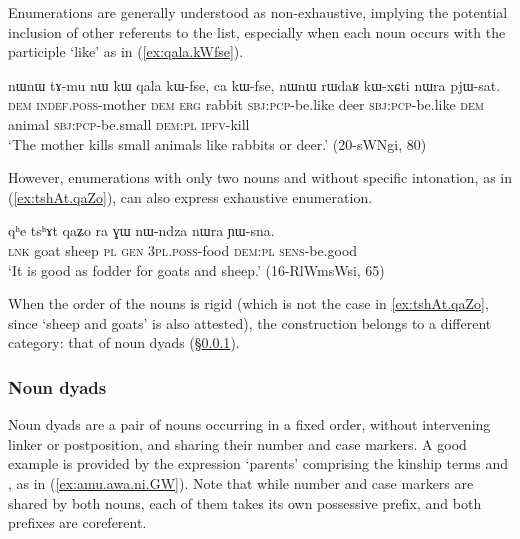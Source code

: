 Enumerations are generally understood as non-exhaustive, implying the potential inclusion of other referents to the list, especially when each noun occurs with the participle  `like' as in (\ref{ex:qala.kWfse}).

\begin{exe}
\ex \label{ex:qala.kWfse}
 \gll  nɯnɯ tɤ-mu nɯ kɯ qala kɯ-fse, ca kɯ-fse, nɯnɯ rɯdaʁ kɯ-xɕti nɯra pjɯ-sat. \\
\textsc{dem} \textsc{indef}.\textsc{poss}-mother \textsc{dem} \textsc{erg} rabbit \textsc{sbj}:\textsc{pcp}-be.like deer \textsc{sbj}:\textsc{pcp}-be.like  \textsc{dem} animal \textsc{sbj}:\textsc{pcp}-be.small \textsc{dem}:\textsc{pl} \textsc{ipfv}-kill \\
\glt `The mother kills small animals like rabbits or deer.' (20-sWNgi, 80)
\end{exe}

However, enumerations with only two  nouns and without specific intonation, as in (\ref{ex:tshAt.qaZo}), can also express exhaustive enumeration.  

\begin{exe}
\ex \label{ex:tshAt.qaZo}
 \gll  qʰe tsʰɤt qaʑo ra ɣɯ nɯ-ndza nɯra ɲɯ-sna.  \\
 \textsc{lnk} goat sheep \textsc{pl} \textsc{gen} \textsc{3pl}.\textsc{poss}-food \textsc{dem}:\textsc{pl} \textsc{sens}-be.good \\
\glt `It is good as fodder for goats and sheep.' (16-RlWmsWsi, 65)
\end{exe}

When the order of the nouns is rigid (which is not the case in \ref{ex:tshAt.qaZo}, since  `sheep and goats' is also attested), the construction belongs to a different category: that of noun dyads (§\ref{sec:dyads}).

\subsubsection{Noun dyads} \label{sec:dyads}
Noun dyads are a pair of nouns occurring in a fixed order, without intervening linker or postposition, and sharing their number and case markers. A good example is provided by the expression `parents' comprising the kinship terms  and , as in (\ref{ex:amu.awa.ni.GW}). Note that while number and case markers are shared by both nouns, each of them takes its own possessive prefix, and both prefixes are coreferent. 

